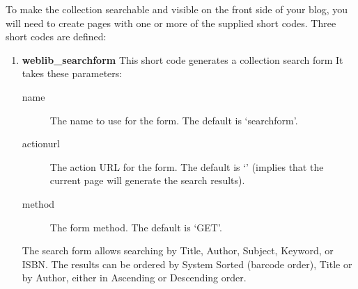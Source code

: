 \documentclass[letterpaper,twoside]{article}
\begin{document}
To make the collection searchable and visible on the front side of your
blog, you will need to create pages with one or more of the supplied
short codes.  Three short codes are defined:
\begin{enumerate}
\item \textbf{weblib\_searchform} This short code generates a collection
search form  It takes these parameters:
  \begin{description}
  \item[name] The name to use for the form. The default is `searchform'.
  \item[actionurl] The action URL for the form. The default is `'
(implies that the current page will generate the search results).
  \item[method] The form method. The default is `GET'.
  \end{description}
The search form allows searching by Title, Author, Subject, Keyword, or
ISBN. The results can be ordered by System Sorted (barcode order), Title
or by Author, either in Ascending or Descending order.


\end{enumerate}
\end{document}
